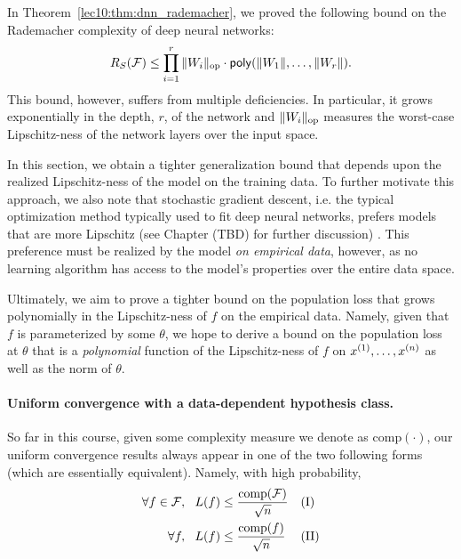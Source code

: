 \label{sec:deep_nets_data_dependent}

In Theorem~\ref{lec10:thm:dnn_rademacher}, we proved the following bound on the Rademacher complexity of deep neural networks:
\begin{align}
R_S(\cF) \leq \prod_{i = 1}^r \norm{W_i}_{\text{op}} \cdot \mathsf{poly}(\norm{W_1}, \dots, \norm{W_r}).
\end{align}
This bound, however, suffers from multiple deficiencies. In particular, it grows exponentially in the depth, $r$, of the network and $\norm{W_i}_{\text{op}}$ measures the worst-case Lipschitz-ness of the network layers over the input space. %

In this section, we obtain a tighter generalization bound that depends upon the realized Lipschitz-ness of the model on the training data. To further motivate this approach, we also note that stochastic gradient descent, i.e. the typical optimization method typically used to fit deep neural networks, prefers models that are more Lipschitz (see Chapter (TBD) for further discussion) . This preference must be realized by the model \emph{on empirical data}, however, as no learning algorithm has access to the model's properties over the entire data space.

Ultimately, we aim to prove a tighter bound on the population loss that grows polynomially in the Lipschitz-ness of $f$ on the empirical data. Namely, given that $f$ is parameterized by some $\theta$, we hope to derive a bound on the population loss at $\theta$ that is a \emph{polynomial} function of the Lipschitz-ness of $f$ on $x\sp{1},\dots,x\sp{n}$ as well as the norm of $\theta$.

\paragraph{Uniform convergence with a data-dependent hypothesis class.}
So far in this course, given some complexity measure we denote as $\text{comp}(\cdot)$, our uniform convergence results always appear in one of the two following forms (which are essentially equivalent). Namely, with high probability,
\begin{align}
\forall f\in \cF, ~~L(f) &\leq \frac{\text{comp}(\cF)}{\sqrt{n}} &&\text{(I)} \\
\forall f, ~~ L(f) &\leq \frac{\text{comp}(f)}{\sqrt{n}}  &&\text{(II)}
\end{align}

